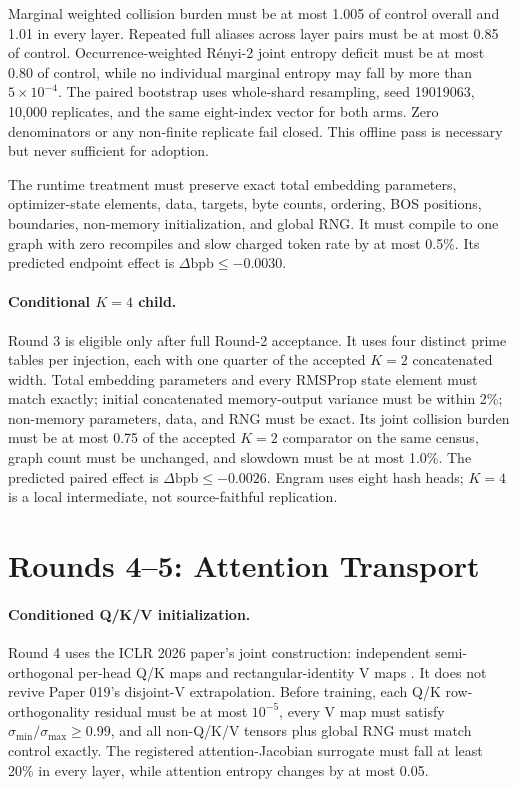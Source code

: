 \documentclass{article}
\newcommand{\bpb}{\mathrm{bpb}}
\begin{document}
Marginal weighted collision burden must be at most 1.005 of control overall
and 1.01 in every layer.  Repeated full aliases across layer pairs must be at
most 0.85 of control.  Occurrence-weighted R\'enyi-2 joint entropy deficit
must be at most 0.80 of control, while no individual marginal entropy may
fall by more than $5\times10^{-4}$.  The paired bootstrap uses whole-shard
resampling, seed 19019063, 10,000 replicates, and the same eight-index vector
for both arms.  Zero denominators or any non-finite replicate fail closed.
This offline pass is necessary but never sufficient for adoption.

The runtime treatment must preserve exact total embedding parameters,
optimizer-state elements, data, targets, byte counts, ordering, BOS
positions, boundaries, non-memory initialization, and global RNG.  It must
compile to one graph with zero recompiles and slow charged token rate by at
most 0.5\%.  Its predicted endpoint effect is
$\Delta\bpb\le-0.0030$.

\paragraph{Conditional $K=4$ child.}
Round 3 is eligible only after full Round-2 acceptance.  It uses four
distinct prime tables per injection, each with one quarter of the accepted
$K=2$ concatenated width.  Total embedding parameters and every RMSProp state
element must match exactly; initial concatenated memory-output variance must
be within 2\%; non-memory parameters, data, and RNG must be exact.  Its joint
collision burden must be at most 0.75 of the accepted $K=2$ comparator on the
same census, graph count must be unchanged, and slowdown must be at most
1.0\%.  The predicted paired effect is
$\Delta\bpb\le-0.0026$.  Engram uses eight hash heads; $K=4$ is a local
intermediate, not source-faithful replication.

\section{Rounds 4--5: Attention Transport}

\paragraph{Conditioned Q/K/V initialization.}
Round 4 uses the ICLR 2026 paper's joint construction: independent
semi-orthogonal per-head Q/K maps and rectangular-identity V maps
\cite{conditioned2026}.  It does not revive Paper 019's disjoint-V
extrapolation.  Before training, each Q/K row-orthogonality residual must be
at most $10^{-5}$, every V map must satisfy
$\sigma_{\min}/\sigma_{\max}\ge0.99$, and all non-Q/K/V tensors plus global
RNG must match control exactly.  The registered attention-Jacobian surrogate
must fall at least 20\% in every layer, while attention entropy changes by at
most 0.05.
\end{document}
